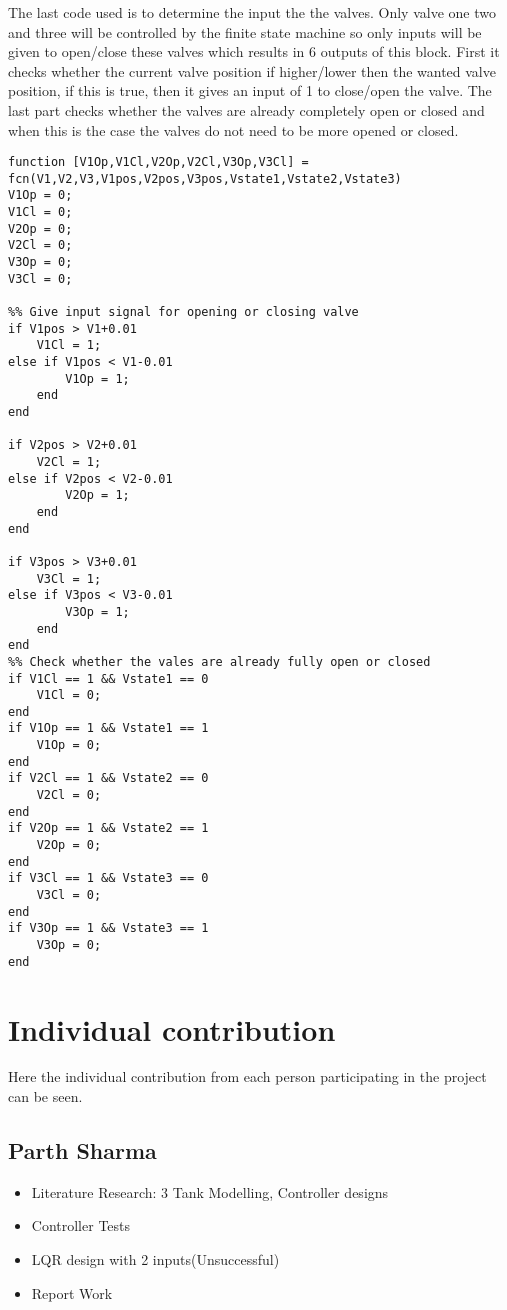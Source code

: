 The last code used is to determine the input the the valves. Only valve one two and three will be controlled by the finite state machine so only inputs will be given to open/close these valves which results in 6 outputs of this block. First it checks whether the current valve position if higher/lower then the wanted valve position, if this is true, then it gives an input of 1 to close/open the valve. The last part checks whether the valves are already completely open or closed and when this is the case the valves do not need to be more opened or closed.

\begin{lstlisting}
function [V1Op,V1Cl,V2Op,V2Cl,V3Op,V3Cl] = fcn(V1,V2,V3,V1pos,V2pos,V3pos,Vstate1,Vstate2,Vstate3)
V1Op = 0;
V1Cl = 0;
V2Op = 0;
V2Cl = 0;
V3Op = 0;
V3Cl = 0;

%% Give input signal for opening or closing valve
if V1pos > V1+0.01
    V1Cl = 1;
else if V1pos < V1-0.01
        V1Op = 1;
    end
end

if V2pos > V2+0.01
    V2Cl = 1;
else if V2pos < V2-0.01
        V2Op = 1;
    end
end

if V3pos > V3+0.01
    V3Cl = 1;
else if V3pos < V3-0.01
        V3Op = 1;
    end
end
%% Check whether the vales are already fully open or closed
if V1Cl == 1 && Vstate1 == 0
    V1Cl = 0;
end
if V1Op == 1 && Vstate1 == 1
    V1Op = 0;
end
if V2Cl == 1 && Vstate2 == 0
    V2Cl = 0;
end
if V2Op == 1 && Vstate2 == 1
    V2Op = 0;
end
if V3Cl == 1 && Vstate3 == 0
    V3Cl = 0;
end
if V3Op == 1 && Vstate3 == 1
    V3Op = 0;
end
\end{lstlisting}





\chapter{Individual contribution}\label{App:Ind_contr}
Here the individual contribution from each person participating in the project can be seen.
\section{Parth Sharma}
\begin{itemize}
\item Literature Research: 3 Tank Modelling, Controller designs
\item Controller Tests
\item LQR design with 2 inputs(Unsuccessful)
\item Report Work
\end{itemize}

